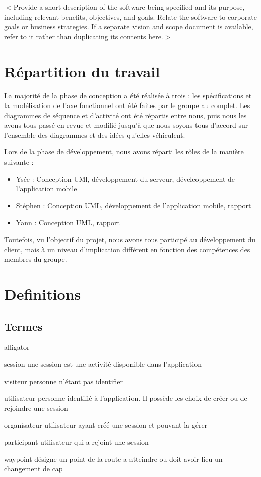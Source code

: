 \documentclass[titlepage, 12pt]{report}
\begin{document}
$<$Provide a short description of the software being specified and its purpose, 
including relevant benefits, objectives, and goals. Relate the software to 
corporate goals or business strategies. If a separate vision and scope document 
is available, refer to it rather than duplicating its contents here.$>$

\section{Répartition du travail}

\par La majorité de la phase de conception a été réalisée à trois : les spécifications et la modélisation de l'axe fonctionnel ont été faites par le groupe au complet.
Les diagrammes de séquence et d'activité ont été répartis entre nous, puis nous les avons tous passé en revue et modifié jusqu'à que nous soyons tous d'accord sur l'ensemble des diagrammes et des idées qu'elles véhiculent.

\par Lors de la phase de développement, nous avons réparti les rôles de la manière suivante : \begin{itemize}
	\item Ysée : Conception UMl, développement du serveur, déveleoppement de l'application mobile
	\item Stéphen : Conception UML, développement de l'application mobile, rapport
	\item Yann : Conception UML, rapport
\end{itemize}
\par Toutefois, vu l'objectif du projet, nous avons tous participé au développement du client, mais à un niveau d'implication différent en fonction des compétences des membres du groupe.

\section{Definitions}
\subsection{Termes}

\begin{labeling}{alligator}
\item [session] une session est une activité disponible dans l’application
\item [visiteur] personne n’étant pas identifier
\item [utilisateur] personne identifié à l’application. Il possède les choix de créer ou de rejoindre une session
\item [organisateur] utilisateur ayant créé une session et pouvant la gérer
\item [participant] utilisateur qui a rejoint une session
\item [waypoint] désigne un point de la route a atteindre ou doit avoir lieu un changement de cap
\end{labeling}
\end{document}
